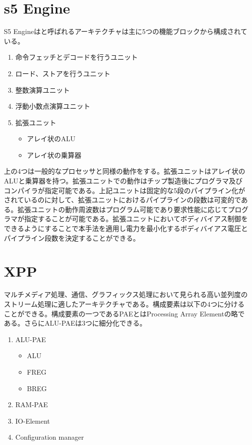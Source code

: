 {\section{s5 Engine}
\label{sec:s5}
S5 Engineはと呼ばれるアーキテクチャは主に5つの機能ブロックから構成されている。
\begin{enumerate}
\item 命令フェッチとデコードを行うユニット
\item ロード、ストアを行うユニット
\item 整数演算ユニット
\item 浮動小数点演算ユニット
\item 拡張ユニット
	\begin{itemize}
	\item アレイ状のALU
	\item アレイ状の乗算器
	\end{itemize}
\end{enumerate}

上の4つは一般的なプロセッサと同様の動作をする。拡張ユニットはアレイ状のALUと乗算器を持つ。拡張ユニットでの動作はチップ製造後にプログラマ及びコンパイラが指定可能である。上記ユニットは固定的な5段のパイプライン化がされているのに対して、拡張ユニットにおけるパイプラインの段数は可変的である。拡張ユニットの動作周波数はプログラム可能であり要求性能に応じてプログラマが指定することが可能である。拡張ユニットにおいてボディバイアス制御をできるようにすることで本手法を適用し電力を最小化するボディバイアス電圧とパイプライン段数を決定することができる。

\section{XPP}
\label{sec:XPP}
マルチメディア処理、通信、グラフィックス処理において見られる高い並列度のストリーム処理に適したアーキテクチャである。構成要素は以下の4つに分けることができる。構成要素の一つであるPAEとはProcessing Array Elementの略である。さらにALU-PAEは3つに細分化できる。
\begin{enumerate}
\item ALU-PAE
	\begin{itemize}
	\item ALU
	\item FREG
	\item BREG
	\end{itemize}
\item RAM-PAE
\item IO-Element
\item Configuration manager
\end{enumerate}

}
